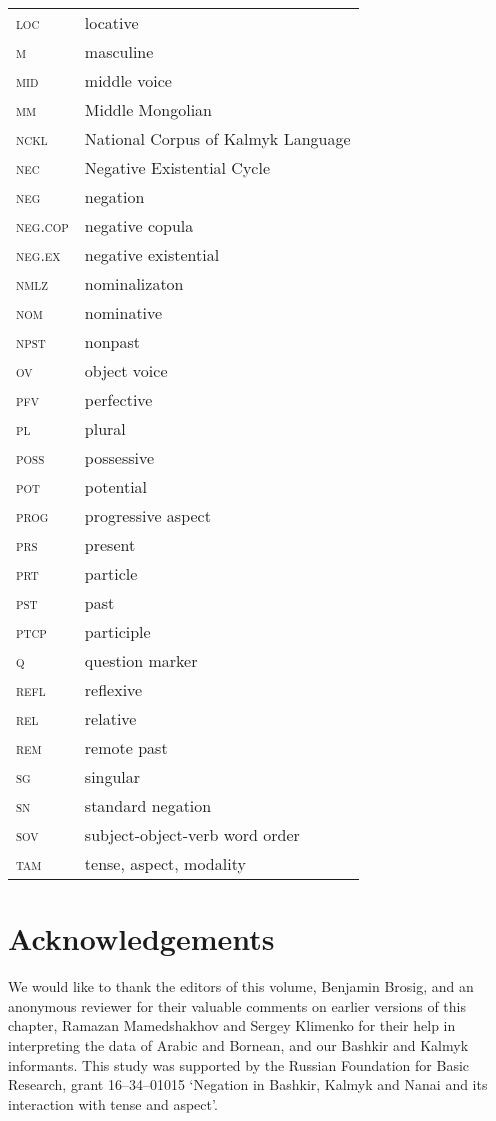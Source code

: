 \documentclass[output=paper,draft,draftmode,colorlinks,citecolor=brown]{langscibook}
\begin{document}
\begin{tabularx}{.45\textwidth}{lQ}
    \textsc{loc} & locative\\
    \textsc{m} & masculine\\
    \textsc{mid} & middle voice\\
    \textsc{mm} & Middle Mongolian\\
    \textsc{nckl} & National Corpus of Kalmyk Language\\
    \textsc{nec} & Negative Existential Cycle\\
    \textsc{neg} & negation\\
     \textsc{neg.cop} & negative copula\\
    \textsc{neg.ex} & negative existential\\
    \textsc{nmlz} & nominalizaton\\
    \textsc{nom} & nominative\\
    \textsc{npst} & nonpast\\
    \textsc{ov} & object voice\\
    \textsc{pfv} & perfective\\
    \textsc{pl} & plural\\
   \textsc{poss} & possessive\\
    \textsc{pot} & potential\\
    \textsc{prog} & progressive aspect\\
    \textsc{prs} & present\\
   \textsc{prt} & particle\\
    \textsc{pst} & past\\
    \textsc{ptcp} & participle\\
    \textsc{q} & question marker\\
     \textsc{refl} & reflexive\\
    \textsc{rel} & relative\\
    \textsc{rem} & remote past\\
    \textsc{sg} & singular\\
     \textsc{sn} & standard negation\\
    \textsc{sov} & subject-object-verb word order\\
    \textsc{tam} & tense, aspect, modality\\
\end{tabularx}


\section*{Acknowledgements}
We would like to thank the editors of this volume, Benjamin Brosig, and an anonymous reviewer for their valuable comments on earlier versions of this chapter, Ramazan Mamedshakhov and Sergey Klimenko for their help in interpreting the data of Arabic and Bornean, and our Bashkir and Kalmyk informants. This study was supported by the Russian Foundation for Basic Research, grant 16--34--01015 ‘Negation in Bashkir, Kalmyk and Nanai and its interaction with tense and aspect’.



{\sloppy\printbibliography[heading=subbibliography,notkeyword=this]}
\end{document}
